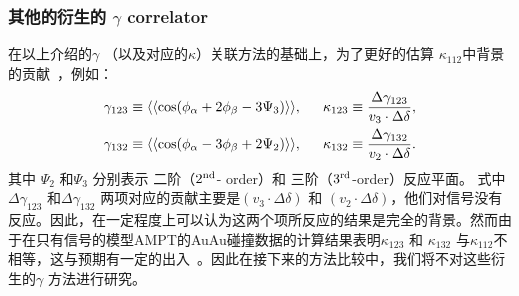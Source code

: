 \subsubsection{其他的衍生的 $\gamma$ correlator}
在以上介绍的$\gamma$ （以及对应的$\kappa$）关联方法的基础上，为了更好的估算 $\kappa_{112}$中背景的贡献~\cite{CMS2}，例如：
\begin{eqnarray}
\gamma_{123} \equiv \langle \langle \cos(\phi_\alpha + 2\phi_\beta -3{\rm \Psi_{3}}) \rangle\rangle&,~\ & \kappa_{123} \equiv \frac{\Delta \gamma_{123}}{v_3 \cdot \Delta \delta}, 
\\
\gamma_{132} \equiv \langle \langle \cos(\phi_\alpha - 3\phi_\beta + 2{\rm \Psi_{2}}) \rangle\rangle&,~\ &
\kappa_{132} \equiv \frac{\Delta \gamma_{132}}{v_2 \cdot \Delta \delta}.
\end{eqnarray}
其中 $\Psi_{2}$ 和$\Psi_{3}$ 分别表示 二阶（$2^{\rm nd}$- order）和 三阶（$3^{\rm rd}$-order）反应平面。
式中$\Delta\gamma_{123}$ 和$\Delta\gamma_{132}$ 两项对应的贡献主要是$(v_3 \cdot \Delta\delta)$ 和 $(v_2 \cdot \Delta\delta)$，他们对信号没有反应。因此，在一定程度上可以认为这两个项所反应的结果是完全的背景。然而由于在只有信号的模型AMPT的AuAu碰撞数据的计算结果表明$\kappa_{123}$ 和 $\kappa_{132}$ 与$\kappa_{112}$不相等，这与预期有一定的出入~\cite{Subikash}。因此在接下来的方法比较中，我们将不对这些衍生的$\gamma$ 方法进行研究。

